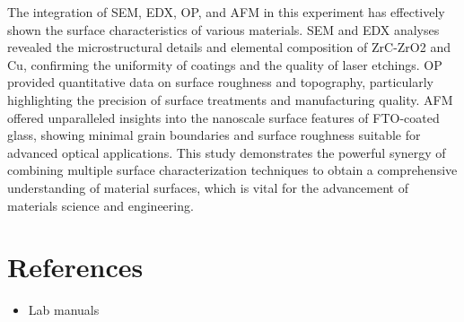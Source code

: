 \documentclass[11pt]{article}
\begin{document}
	The integration of SEM, EDX, OP, and AFM in this experiment has effectively shown the surface characteristics of various materials. SEM and EDX analyses revealed the microstructural details and elemental composition of ZrC-ZrO2 and Cu, confirming the uniformity of coatings and the quality of laser etchings. OP provided quantitative data on surface roughness and topography, particularly highlighting the precision of surface treatments and manufacturing quality. AFM offered unparalleled insights into the nanoscale surface features of FTO-coated glass, showing minimal grain boundaries and surface roughness suitable for advanced optical applications. This study demonstrates the powerful synergy of combining multiple surface characterization techniques to obtain a comprehensive understanding of material surfaces, which is vital for the advancement of materials science and engineering.
	
\clearpage
	
	\section{References}
	
	\begin{itemize}
		\item Lab manuals
	\end{itemize}
	
\end{document}
